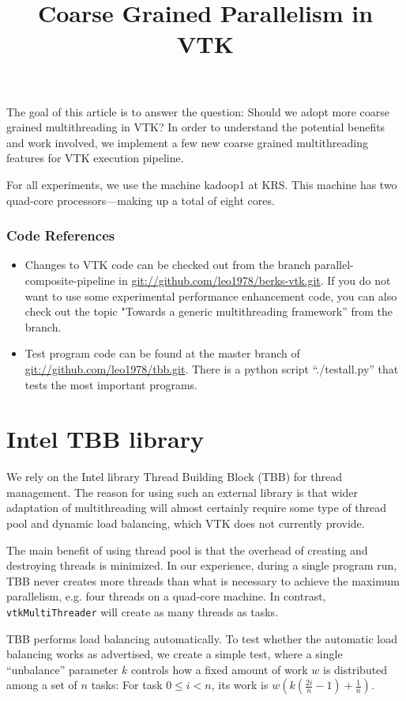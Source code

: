 \documentclass{article}
\title{Coarse Grained Parallelism in VTK}
\date{}
\begin{document}
\maketitle{}

The goal of this article is to answer the question: Should we adopt
more coarse grained multithreading in VTK? In order to understand the
potential benefits and work involved, we implement a few new coarse
grained multithreading features for VTK execution pipeline.

For all experiments, we use the machine kadoop1 at KRS. This machine
has two quad-core processors---making up a total of eight cores.

\subsubsection*{Code References}
\begin{itemize}
\item Changes to VTK code can be checked out from the branch
  parallel-composite-pipeline in
  \url{git://github.com/leo1978/berks-vtk.git}.  If you do not want to
  use some experimental performance enhancement code, you can also
  check out the topic "Towards a generic multithreading framework'' from the branch.
\item Test program code can be found at the master branch of
  \url{git://github.com/leo1978/tbb.git}. There is a python script
  ``./testall.py'' that tests the most important programs.
\end{itemize}


\section{Intel TBB library}
We rely on the Intel library Thread Building Block (TBB) for thread
management. The reason for using such an external library is that
wider adaptation of multithreading will almost certainly require some
type of thread pool and dynamic load balancing, which VTK does not
currently provide.

The main benefit of using thread pool is that the overhead of creating
and destroying threads is minimized. In our experience, during a
single program run, TBB never creates more threads than what is
necessary to achieve the maximum parallelism, e.g. four threads on a
quad-core machine. In contrast, {\tt vtkMultiThreader} will create as many
threads as tasks.

TBB performs load balancing automatically. To test whether the
automatic load balancing works as advertised, we create a simple
test, where a single ``unbalance'' parameter $k$ controls how a
fixed amount of work $w$ is distributed among a set of $n$ tasks: For
task $0\le i<n$, its work is
$w\left(k(\frac{2i}{n}-1)+\frac{1}{n}\right)$.
\end{document}
